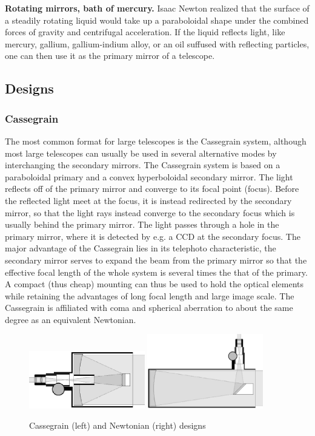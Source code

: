 \noindent
{\bf Rotating mirrors, bath of mercury.} Isaac Newton realized that the surface of a steadily rotating liquid would take up a paraboloidal shape under the combined forces of gravity and
centrifugal acceleration. If the liquid reflects light, like mercury, gallium, gallium-indium alloy, or an oil suffused with reflecting particles, one can then use it as the primary mirror of a telescope. 

\subsection{Designs}

\subsubsection{Cassegrain}
The most common format for large telescopes is the Cassegrain system, although
most large telescopes can usually be used in several alternative 
modes by interchanging the secondary mirrors. The Cassegrain system is
based on a paraboloidal primary and a convex hyperboloidal secondary mirror.
The light reflects off of the primary mirror and converge to its focal point (focus).
Before the reflected light meet at the focus, it is instead redirected by the
secondary mirror, so that the light rays instead
converge to the secondary focus which is usually behind the primary mirror. The light passes 
through a hole in the primary mirror, where it is detected by e.g. a CCD at the secondary
focus.
The major advantage of the Cassegrain lies in its telephoto characteristic, 
the secondary mirror serves to expand the beam from the primary mirror so 
that the effective focal length of the whole system is several times the
that of the primary. A compact (thus cheap) mounting can thus be used to 
hold the optical elements while retaining the advantages of long focal length
and large image scale. The Cassegrain is affiliated with coma and spherical
aberration to about the same degree as an equivalent Newtonian.

\begin{figure}[th!]
	\centering
	\includegraphics[width=0.45\textwidth]{cassegraindetailed.eps}
	\includegraphics[width=0.45\textwidth]{newtoniandetailed.eps}
  \caption{Cassegrain (left) and Newtonian (right) designs}
  \label{fig:catatropic}
\end{figure}

